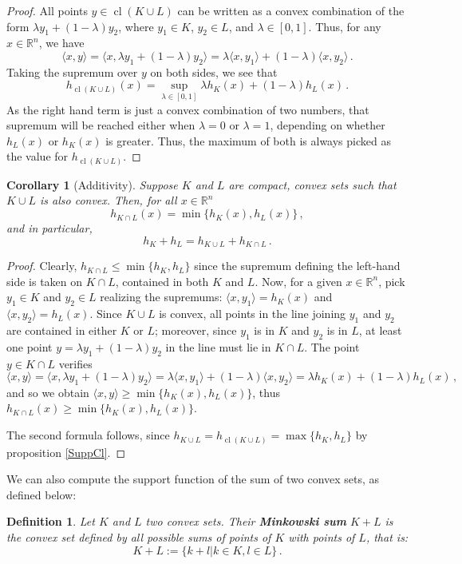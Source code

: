 \documentclass[a4paper]{article}
\newtheorem{coro}[theorem]{Corollary}
\newtheorem{definition}[theorem]{Definition}
\newcommand{\bb}{\mathbb}
\begin{document}
\begin{proof}
	All points $y\in \operatorname{cl}(K \cup L)$ can be written as a convex combination of the form $\lambda y_1+(1-\lambda) y_2$, where $y_1 \in K$, $y_2 \in L$, and $\lambda \in [0,1]$. Thus, for any $x\in \bb R^n$, we have \[\langle x,y \rangle=\langle x,\lambda y_1+(1-\lambda) y_2 \rangle=\lambda \langle x,y_1\rangle +(1-\lambda) \langle x,y_2\rangle\, .\]
	Taking the supremum over $y$ on both sides, we see that
	\[ h_{\operatorname{cl}(K \cup L)}(x)=\sup_{\lambda \in [0,1]} \lambda h_K(x)+ (1-\lambda) h_L(x)\, .\]
	As the right hand term is just a convex combination of two numbers, that supremum will be reached either when $\lambda=0$ or $\lambda=1$, depending on whether $h_L(x)$ or $h_K(x)$ is greater. Thus, the maximum of both is always picked as the value for $h_{\operatorname{cl}(K \cup L)}$.
\end{proof}

\begin{coro}[Additivity]
	\label{SuppInt}
	Suppose $K$ and $L$ are compact, convex sets such that $K \cup L$ is also convex. Then, for all $x\in \bb R^n$
	\[ h_{K\cap L}(x)=\min\{h_K(x), h_L(x)\}\, , \]
	and in particular,
	\[ h_K+h_L=h_{K \cup L}+h_{K \cap L}\, . \]
\end{coro}

\begin{proof}
	Clearly, $h_{K \cap L}\leq \min\{h_K, h_L\}$ since the supremum defining the left-hand side is taken on $K \cap L$, contained in both $K$ and $L$. Now, for a given $x \in \bb R^n$, pick $y_1 \in K$ and $y_2 \in L$ realizing the supremums: $\langle x,y_1\rangle=h_K(x)$ and $\langle x,y_2 \rangle=h_L(x)$. Since $K \cup L$ is convex, all points in the line joining $y_1$ and $y_2$ are contained in either $K$ or $L$; moreover, since $y_1$ is in $K$ and $y_2$ is in $L$, at least one point $y=\lambda y_1+(1-\lambda) y_2$ in the line must lie in $K \cap L$. The point $y\in K \cap L$ verifies 
	\[\langle x, y\rangle=\langle x, \lambda y_1+(1-\lambda) y_2 \rangle=\lambda \langle x, y_1 \rangle +(1-\lambda) \langle x,y_2\rangle=\lambda h_K(x)+(1-\lambda) h_L(x) \, ,\]
	and so we obtain $\langle x, y \rangle\geq \min\{ h_K(x), h_L(x) \}$, thus $h_{K \cap L}(x) \geq \min\{h_K(x), h_L(x)\}$.
	
	The second formula follows, since $h_{K \cup L}=h_{\operatorname{cl}(K \cup L)}=\max\{h_K, h_L\}$ by proposition \ref{SuppCl}.
\end{proof}


We can also compute the support function of the sum of two convex sets, as defined below:
\begin{definition}
	Let $K$ and $L$ two convex sets. Their \textbf{Minkowski sum} $K+L$ is the convex set defined by all possible sums of points of $K$ with points of $L$, that is: 
	\[ K+L:=\{ k+l | k \in K, l \in L \}\, . \]
\end{definition}
\end{document}
